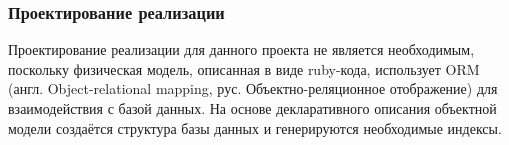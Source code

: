 \subsubsection{Проектирование реализации}

Проектирование реализации для данного проекта не является необходимым, поскольку физическая модель, описанная в виде ruby-кода, использует ORM (англ. Object-relational mapping, рус. Объектно-реляционное отображение) для взаимодействия с базой данных. На основе декларативного описания объектной модели создаётся структура базы данных и генерируются необходимые индексы.
